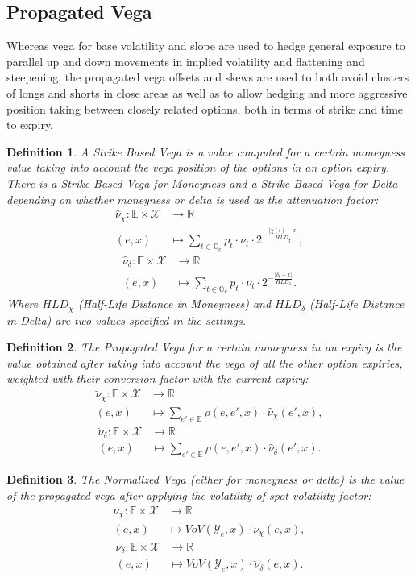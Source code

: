 \documentclass[10pt, a4paper, oneside]{article}
\newcommand{\R}{\ensuremath{\mathbb{R}}}
\def\ds{\displaystyle}
\newtheorem*{definition}{Definition}
\newcommand{\function}[5]{\begin{split} #1\colon #2 &\to #3 \\ #4 &\mapsto #5\end{split}}
\newcommand{\expiries}{\ensuremath{\mathbb{E}}}
\newcommand{\options}{\ensuremath{\mathbb{O}}}
\newcommand{\moneynessset}{\ensuremath{\mathcal{X}}}
\newcommand{\vega}{\ensuremath{\nu}}
\newcommand{\pos}{\ensuremath{p}}
\newcommand{\yte}{\ensuremath{\mathcal{Y}}}
\newcommand{\pvega}{\ensuremath{\hat{\vega}}}
\newcommand{\pvegam}{\ensuremath{{\pvega_\moneyness}}}
\newcommand{\pvegad}{\ensuremath{{\pvega_\delta}}}
\newcommand{\fvega}{\ensuremath{\breve{\vega}}}
\newcommand{\fvegam}{\ensuremath{{\fvega_\moneyness}}}
\newcommand{\fvegad}{\ensuremath{{\fvega_\delta}}}
\newcommand{\nvega}{\ensuremath{\dot{\vega}}}
\newcommand{\nvegam}{\ensuremath{{\nvega_\moneyness}}}
\newcommand{\nvegad}{\ensuremath{{\nvega_\delta}}}
\newcommand{\moneyness}{\ensuremath{\chi}}
\newcommand{\VoV}{\ensuremath{\mathit{Vo\!V}}}
\begin{document}
\subsection{Propagated Vega}

\noindent Whereas vega for base volatility and slope are used to hedge general exposure to parallel up and down movements in implied volatility and flattening and steepening, the propagated vega offsets and skews are used to both avoid clusters of longs and shorts in
close areas as well as to allow hedging and more aggressive position taking between closely related options, both in terms of strike and time to expiry.

\begin{definition} A \emph{Strike Based Vega} is a value computed for a certain moneyness value taking into account the vega position of the options in an option expiry. There is a \emph{Strike Based Vega for Moneyness} and a \emph{Strike Based Vega for Delta} depending
on whether moneyness or delta is used as the attenuation factor:
\[ \function{\pvegam}{\expiries\times\moneynessset}{\R}{(e, x)}{\sum_{t\in\options_e}\pos_t\cdot\vega_t\cdot\ds 2^{-\frac{|\moneyness(t) - x|}{\mathit{HLD}_\moneyness}},}\]
\[ \function{\pvegad}{\expiries\times\moneynessset}{\R}{(e, x)}{\sum_{t\in\options_e}\pos_t\cdot\vega_t\cdot\ds 2^{-\frac{|\delta_t - x|}{\mathit{HLD}_\delta}}.}\]
Where $\mathit{HLD}_\moneyness$ \emph{(Half-Life Distance in Moneyness)} and $\mathit{HLD}_\delta$ \emph{(Half-Life Distance in Delta)} are two values specified in the settings.
\end{definition}




\begin{definition} The \emph{Propagated Vega} for a certain moneyness in an expiry is the value obtained after taking into account the vega of all the other option expiries, weighted with their conversion factor with the current expiry:
 \[ \function{\fvegam}{\expiries\times\moneynessset}{\R}{(e, x)}{\sum_{e'\in\expiries}\rho(e,e',x)\cdot\pvegam(e', x),} \]
 \[ \function{\fvegad}{\expiries\times\moneynessset}{\R}{(e, x)}{\sum_{e'\in\expiries}\rho(e,e',x)\cdot\pvegad(e', x).} \]
\end{definition}

\begin{definition} The \emph{Normalized Vega} (either for moneyness or delta) is the value of the propagated vega after applying the volatility of spot volatility factor:
\[ \function{\nvegam}{\expiries\times\moneynessset}{\R}{(e, x)}{\VoV(\yte_e, x)\cdot\fvegam(e, x),} \]
\[ \function{\nvegad}{\expiries\times\moneynessset}{\R}{(e, x)}{\VoV(\yte_e, x)\cdot\fvegad(e, x).} \]
\end{definition}
\end{document}
